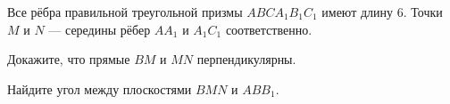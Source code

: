 \begin{ex}
	\begin{condition}
		Все рёбра правильной треугольной призмы \( ABCA_1B_1C_1 \) имеют длину \( 6 \). Точки \( M \) и \( N \) --- середины рёбер \( AA_1 \) и \( A_1C_1 \) соответственно.
			\begin{enumcols}[label=\asbuk*)]
				\item Докажите, что прямые \( BM \) и \( MN \) перпендикулярны.
				\item Найдите угол между плоскостями \( BMN \) и \( ABB_1 \).
			\end{enumcols}
	\end{condition}
\end{ex}